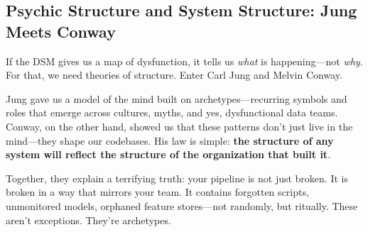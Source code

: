 \subsection{Psychic Structure and System Structure: Jung Meets Conway}

If the DSM gives us a map of dysfunction, it tells us \textit{what} is happening—not \textit{why}. For that, we need theories of structure. Enter Carl Jung and Melvin Conway.

Jung gave us a model of the mind built on archetypes—recurring symbols and roles that emerge across cultures, myths, and yes, dysfunctional data teams. Conway, on the other hand, showed us that these patterns don’t just live in the mind—they shape our codebases. His law is simple: \textbf{the structure of any system will reflect the structure of the organization that built it}.

Together, they explain a terrifying truth: your pipeline is not just broken. It is broken in a way that mirrors your team. It contains forgotten scripts, unmonitored models, orphaned feature stores—not randomly, but ritually. These aren’t exceptions. They’re archetypes.

